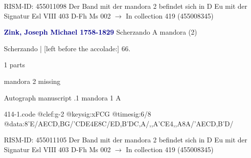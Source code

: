 \documentclass[twocolumn]{book}
\begin{document}
\newline RISM-ID: 455011098
\newline Der Band mit der mandora 2 befindet sich in D Eu mit der Signatur Esl VIII 403
\newline D-Fh  Ms 002
\newline $\rightarrow$ In collection 419 (455008345)

\newline \par \vspace{7pt} \textcolor{darkblue}{\textbf{Zink, Joseph Michael  1758-1829}}
\newline Scherzando  A  
\newline mandora (2)
\newline \begin{itshape}[f.34v, at left:] Scherzando | [left before the accolade:] 66.\end{itshape} 
\newline \textcolor{darkblue}{}  1 parts  
\newline \begin{small} mandora 2 missing\end{small} 
\newline Autograph manuscript
.1  mandora 1  A  
\begin{filecontents*}{414-1.code}
@clef:g-2
@keysig:xFCG
@timesig:6/8
@data:8'E/AECD,BG/'CDE4E8C/ED,B'DC,A/,,A'CE4,,A8A/'AECD,B'D/
\end{filecontents*}
\newline
%

\newline RISM-ID: 455011105
\newline Der Band mit der mandora 2 befindet sich in D Eu mit der Signatur Esl VIII 403
\newline D-Fh  Ms 002
\newline $\rightarrow$ In collection 419 (455008345)
\end{document}
